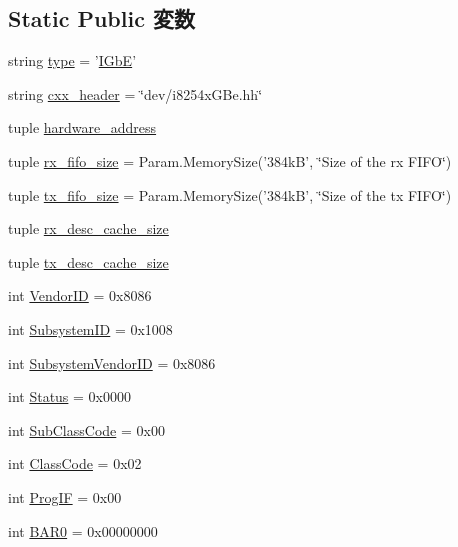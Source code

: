 \subsection*{Static Public 変数}
\begin{DoxyCompactItemize}
\item 
string \hyperlink{classEthernet_1_1IGbE_acce15679d830831b0bbe8ebc2a60b2ca}{type} = '\hyperlink{classEthernet_1_1IGbE}{IGbE}'
\item 
string \hyperlink{classEthernet_1_1IGbE_a17da7064bc5c518791f0c891eff05fda}{cxx\_\-header} = \char`\"{}dev/i8254xGBe.hh\char`\"{}
\item 
tuple \hyperlink{classEthernet_1_1IGbE_a0a01a2a0083560db04121eeee8c8e9fe}{hardware\_\-address}
\item 
tuple \hyperlink{classEthernet_1_1IGbE_a4b48836aef9c8017ad618a4a50417609}{rx\_\-fifo\_\-size} = Param.MemorySize('384kB', \char`\"{}Size of the rx FIFO\char`\"{})
\item 
tuple \hyperlink{classEthernet_1_1IGbE_ade05cdf962b2bfb207d5c864432949b8}{tx\_\-fifo\_\-size} = Param.MemorySize('384kB', \char`\"{}Size of the tx FIFO\char`\"{})
\item 
tuple \hyperlink{classEthernet_1_1IGbE_a0ed725185798e608032b376fe4c05270}{rx\_\-desc\_\-cache\_\-size}
\item 
tuple \hyperlink{classEthernet_1_1IGbE_af7155ed10ccac20bb6742fa6bcf25c7d}{tx\_\-desc\_\-cache\_\-size}
\item 
int \hyperlink{classEthernet_1_1IGbE_a96ec1b4422f12f72160a0633ada47217}{VendorID} = 0x8086
\item 
int \hyperlink{classEthernet_1_1IGbE_a4d1c38afb909fcd8a72313e8feb9b9e1}{SubsystemID} = 0x1008
\item 
int \hyperlink{classEthernet_1_1IGbE_a6b551917884afdfa2108dc0574bcd1e1}{SubsystemVendorID} = 0x8086
\item 
int \hyperlink{classEthernet_1_1IGbE_ae58c2415cf1178457fa1254234c3f017}{Status} = 0x0000
\item 
int \hyperlink{classEthernet_1_1IGbE_a6537e94b8ab06acd357673ec1699adc8}{SubClassCode} = 0x00
\item 
int \hyperlink{classEthernet_1_1IGbE_a7d0125d1930fad943a6a7471da0317ad}{ClassCode} = 0x02
\item 
int \hyperlink{classEthernet_1_1IGbE_aa63e82532e33e89795f472cfb7e0bb67}{ProgIF} = 0x00
\item 
int \hyperlink{classEthernet_1_1IGbE_aa4b1656989a2151c14fc1d464df6531c}{BAR0} = 0x00000000
\item 

\end{DoxyCompactItemize}
